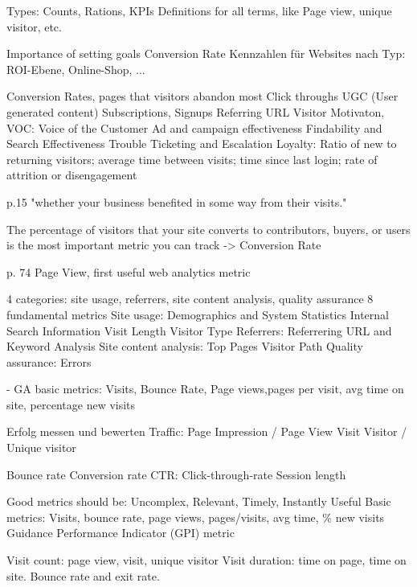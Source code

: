  Types: Counts, Rations, KPIs
 Definitions for all terms, like Page view, unique visitor, etc.



 Importance of setting goals
 Conversion Rate
 Kennzahlen für Websites nach Typ: ROI-Ebene, Online-Shop, ...


 Conversion Rates, pages that visitors abandon most
 Click throughs
 UGC (User generated content)
 Subscriptions, Signups
 Referring URL
 Visitor Motivaton, VOC: Voice of the Customer
 Ad and campaign effectiveness
 Findability and Search Effectiveness
 Trouble Ticketing and Escalation
 Loyalty: Ratio of new to returning visitors; average time between visits; time since last login; rate of attrition or disengagement


p.15 "whether your business benefited in some way from their visits."

The percentage of visitors that your site converts to contributors, buyers, or users is the most important metric you can track -> Conversion Rate

p. 74 Page View, first useful web analytics metric



 4 categories: site usage, referrers, site content analysis, quality assurance
 8 fundamental metrics
 Site usage:
	 Demographics and System Statistics
	 Internal Search Information
	 Visit Length
	 Visitor Type	
 Referrers:
	 Referrering URL and Keyword Analysis	
 Site content analysis:
	 Top Pages
	 Visitor Path
 Quality assurance:
	 Errors
	


- GA basic metrics: Visits, Bounce Rate, Page views,pages per visit, avg time on site, percentage new visits


 Erfolg messen und bewerten
 Traffic:
	 Page Impression / Page View
	 Visit
	 Visitor / Unique visitor
	
 Bounce rate
 Conversion rate
 CTR: Click-through-rate
 Session length


 Good metrics should be: Uncomplex, Relevant, Timely, Instantly Useful
 Basic metrics: Visits, bounce rate, page views, pages/visits, avg time, \% new visits
 Guidance Performance Indicator (GPI) metric


 Visit count: page view, visit, unique visitor
 Visit duration: time on page, time on site.
 Bounce rate and exit rate.


